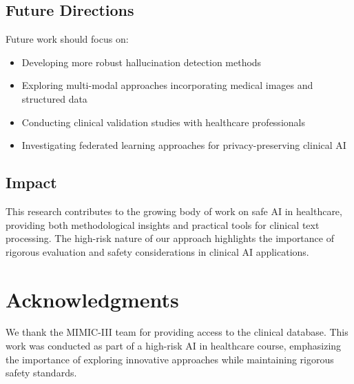 \documentclass[sigconf]{acmart}
\begin{document}
\subsection{Future Directions}
Future work should focus on:
\begin{itemize}
    \item Developing more robust hallucination detection methods
    \item Exploring multi-modal approaches incorporating medical images and structured data
    \item Conducting clinical validation studies with healthcare professionals
    \item Investigating federated learning approaches for privacy-preserving clinical AI
\end{itemize}

\subsection{Impact}
This research contributes to the growing body of work on safe AI in healthcare, providing both methodological insights and practical tools for clinical text processing. The high-risk nature of our approach highlights the importance of rigorous evaluation and safety considerations in clinical AI applications.

\section{Acknowledgments}
We thank the MIMIC-III team for providing access to the clinical database. This work was conducted as part of a high-risk AI in healthcare course, emphasizing the importance of exploring innovative approaches while maintaining rigorous safety standards.
\end{document}
